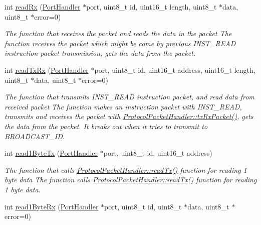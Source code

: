 \begin{DoxyCompactItemize}
int \hyperlink{classmercury_1_1_protocol_packet_handler_af7ff32d0eca6395b92bf7efc02118a27}{read\+Rx} (\hyperlink{classmercury_1_1_port_handler}{Port\+Handler} $\ast$port, uint8\+\_\+t id, uint16\+\_\+t length, uint8\+\_\+t $\ast$data, uint8\+\_\+t $\ast$error=0)
\begin{DoxyCompactList}\small\item\em The function that receives the packet and reads the data in the packet  The function receives the packet which might be come by previous I\+N\+S\+T\+\_\+\+R\+E\+AD instruction packet transmission,  gets the data from the packet. \end{DoxyCompactList}\item 
int \hyperlink{classmercury_1_1_protocol_packet_handler_a368325ca9c0c783b1e88ef32a4544e51}{read\+Tx\+Rx} (\hyperlink{classmercury_1_1_port_handler}{Port\+Handler} $\ast$port, uint8\+\_\+t id, uint16\+\_\+t address, uint16\+\_\+t length, uint8\+\_\+t $\ast$data, uint8\+\_\+t $\ast$error=0)
\begin{DoxyCompactList}\small\item\em The function that transmits I\+N\+S\+T\+\_\+\+R\+E\+AD instruction packet, and read data from received packet  The function makes an instruction packet with I\+N\+S\+T\+\_\+\+R\+E\+AD,  transmits and receives the packet with \hyperlink{classmercury_1_1_protocol_packet_handler_a68b02f23af616886d0795ea12debd613}{Protocol\+Packet\+Handler\+::tx\+Rx\+Packet()},  gets the data from the packet.  It breaks out  when it tries to transmit to B\+R\+O\+A\+D\+C\+A\+S\+T\+\_\+\+ID. \end{DoxyCompactList}\item 
int \hyperlink{classmercury_1_1_protocol_packet_handler_a764ccc29353523b4a9d65fb4f49e8a34}{read1\+Byte\+Tx} (\hyperlink{classmercury_1_1_port_handler}{Port\+Handler} $\ast$port, uint8\+\_\+t id, uint16\+\_\+t address)
\begin{DoxyCompactList}\small\item\em The function that calls \hyperlink{classmercury_1_1_protocol_packet_handler_aebb2c28d6b3f2e87c7a56b757a24810b}{Protocol\+Packet\+Handler\+::read\+Tx()} function for reading 1 byte data  The function calls \hyperlink{classmercury_1_1_protocol_packet_handler_aebb2c28d6b3f2e87c7a56b757a24810b}{Protocol\+Packet\+Handler\+::read\+Tx()} function for reading 1 byte data. \end{DoxyCompactList}\item 
int \hyperlink{classmercury_1_1_protocol_packet_handler_a36f76224ff911f5bdcc7216ce0f552e3}{read1\+Byte\+Rx} (\hyperlink{classmercury_1_1_port_handler}{Port\+Handler} $\ast$port, uint8\+\_\+t id, uint8\+\_\+t $\ast$data, uint8\+\_\+t $\ast$error=0)

\end{DoxyCompactItemize}
